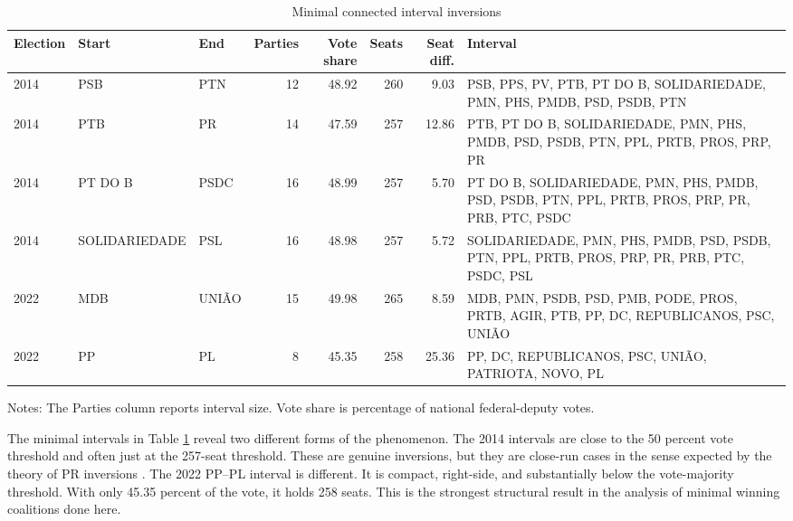 \documentclass[11pt]{article}
\begin{document}
\begin{table}[htbp]
\centering
\caption{Minimal connected interval inversions}
\label{tab:minimal-intervals}
\scriptsize
\begin{tabularx}{\textwidth}{lllr rrrX}
\toprule
Election & Start & End & Parties & Vote share & Seats & Seat diff. & Interval \\
\midrule
2014 & PSB & PTN & 12 & 48.92 & 260 & 9.03 & PSB, PPS, PV, PTB, PT DO B, SOLIDARIEDADE, PMN, PHS, PMDB, PSD, PSDB, PTN \\
2014 & PTB & PR & 14 & 47.59 & 257 & 12.86 & PTB, PT DO B, SOLIDARIEDADE, PMN, PHS, PMDB, PSD, PSDB, PTN, PPL, PRTB, PROS, PRP, PR \\
2014 & PT DO B & PSDC & 16 & 48.99 & 257 & 5.70 & PT DO B, SOLIDARIEDADE, PMN, PHS, PMDB, PSD, PSDB, PTN, PPL, PRTB, PROS, PRP, PR, PRB, PTC, PSDC \\
2014 & SOLIDARIEDADE & PSL & 16 & 48.98 & 257 & 5.72 & SOLIDARIEDADE, PMN, PHS, PMDB, PSD, PSDB, PTN, PPL, PRTB, PROS, PRP, PR, PRB, PTC, PSDC, PSL \\
2022 & MDB & UNIÃO & 15 & 49.98 & 265 & 8.59 & MDB, PMN, PSDB, PSD, PMB, PODE, PROS, PRTB, AGIR, PTB, PP, DC, REPUBLICANOS, PSC, UNIÃO \\
2022 & PP & PL & 8 & 45.35 & 258 & 25.36 & PP, DC, REPUBLICANOS, PSC, UNIÃO, PATRIOTA, NOVO, PL \\
\bottomrule
\end{tabularx}
\begin{flushleft}
\footnotesize Notes: The Parties column reports interval size. Vote share is percentage of national federal-deputy votes.
\end{flushleft}
\end{table}

The minimal intervals in Table \ref{tab:minimal-intervals} reveal two different
forms of the phenomenon. The 2014 intervals are close to the 50 percent vote
threshold and often just at the 257-seat threshold. These are genuine inversions,
but they are close-run cases in the sense expected by the theory of PR
inversions \parencite{miller14_elect_inver_under_propor_repres}. The 2022 PP--PL
interval is different. It is compact, right-side, and substantially below the
vote-majority threshold. With only 45.35 percent of the vote, it holds 258 seats.
This is the strongest structural result in the analysis of minimal winning coalitions done here. 
\end{document}

